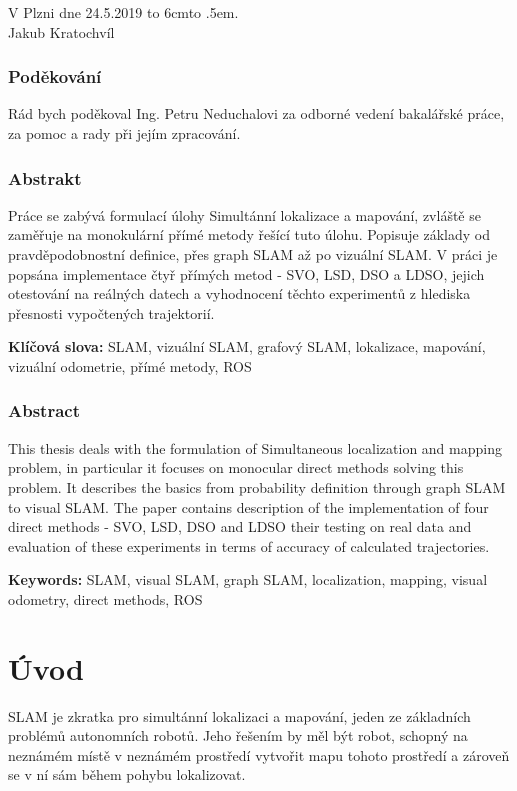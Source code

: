 \documentclass[12pt,a4paper]{report}
\def\dotfill#1{\cleaders\hbox to #1{.}\hfill}
\newcommand\dotline[2][.5em]{\leavevmode\hbox to #2{\dotfill{#1}\hfil}}
\begin{document}
\vspace{2cm}
\noindent
V Plzni dne 24.5.2019 \hfill \dotline{6cm} \\

\hspace*{10.7cm} Jakub Kratochvíl

\vspace{6cm}

\subsection*{Poděkování}

Rád bych poděkoval Ing. Petru Neduchalovi za odborné vedení bakalářské práce, za pomoc a rady při jejím zpracování.

\newpage
\subsection*{Abstrakt}
Práce se zabývá formulací úlohy Simultánní lokalizace a mapování, zvláště se zaměřuje na monokulární přímé metody řešící tuto úlohu. Popisuje základy od pravděpodobnostní definice, přes graph SLAM až po vizuální SLAM. V práci je popsána implementace čtyř přímých metod - SVO, LSD, DSO a LDSO, jejich otestování na reálných datech a vyhodnocení těchto experimentů z hlediska přesnosti vypočtených trajektorií. 

\noindent
\textbf{Klíčová slova:} SLAM, vizuální SLAM, grafový SLAM, lokalizace, mapování, vizuální odometrie, přímé metody, ROS

\subsection*{Abstract}
This thesis deals with the formulation of Simultaneous localization and mapping problem, in particular it focuses on monocular direct methods solving this problem. It describes the basics from probability definition through graph SLAM to visual SLAM. The paper contains description of the implementation of four direct methods - SVO, LSD, DSO and LDSO their testing on real data and evaluation of these experiments in terms of accuracy of calculated trajectories.

\noindent
\textbf{Keywords:} SLAM, visual SLAM, graph SLAM, localization, mapping, visual odometry, direct methods, ROS

\newpage
\tableofcontents
\newpage
\fontsize{12pt}{18pt}\selectfont


\chapter{Úvod}
SLAM je zkratka pro simultánní lokalizaci a mapování, jeden ze základních problémů autonomních robotů. Jeho řešením by měl být robot, schopný na neznámém místě v neznámém prostředí vytvořit mapu tohoto prostředí a zároveň se v ní sám během pohybu lokalizovat.
\end{document}
